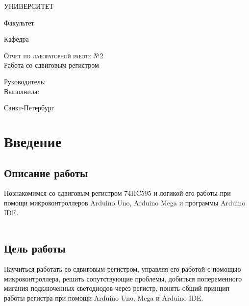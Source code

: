 \documentclass[12pt,a4paper]{scrartcl}
\begin{document}
\begin{titlepage}
  \begin{center}
    \large
 
    УНИВЕРСИТЕТ
    \vspace{0.25cm}
     
    Факультет
     
    Кафедра 
    \vfill
 
    \textsc{Отчет по лабораторной работе №2}\\[5mm]
     
    {\LARGE Работа со сдвиговым регистром}

\end{center}
\vfill
 
\newlength{\ML}
\hfill\begin{minipage}{0.4\textwidth}
  Руководитель:\\
  Выполнила:  \\

  
  
\end{minipage}%
\bigskip

 
\begin{center}
  Санкт-Петербург
\end{center}
\end{titlepage}

\begin{tableofcontents}
\end{tableofcontents}
    \newpage
    
\section{Введение}

\label{sec:intro}
 

\subsection{Описание работы}
Познакомимся со сдвиговым регистром 74HC595 и логикой его работы при помощи микроконтроллеров Arduino Uno, Arduino Mega и программы Arduino IDE.\\
\\

\subsection{Цель работы}
Научиться работать со сдвиговым регистром, управляя его работой с помощью микроконтроллера, решить сопутствующие проблемы, добиться попеременного мигания подключенных светодиодов через регистр, понять общий принцип работы регистра при помощи Arduino Uno, Mega и Arduino IDE.
\end{document}
